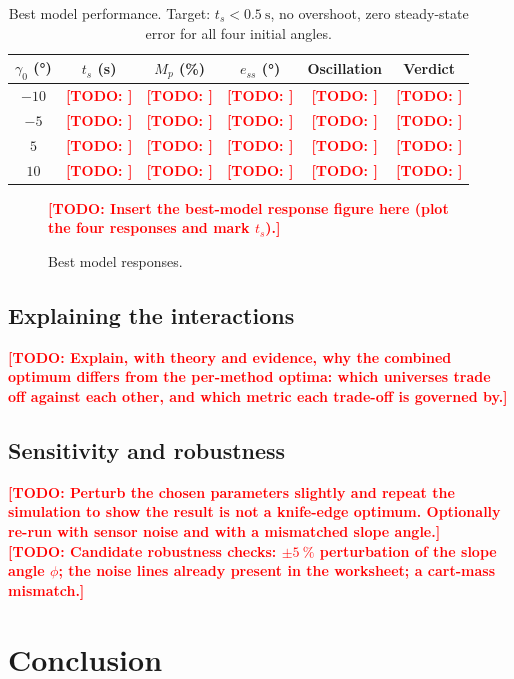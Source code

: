 \documentclass[11pt,a4paper]{article}
\newcommand{\todo}[1]{\textcolor{red}{\textbf{[TODO: #1]}}}
\newcommand{\gam}{\ensuremath{\gamma}}
\newcommand{\ts}{\ensuremath{t_s}}
\newcommand{\overshoot}{\ensuremath{M_p}}
\newcommand{\sse}{\ensuremath{e_{ss}}}
\begin{document}
\begin{table}[H]
\centering
\small
\begin{tabular}{@{}cccccc@{}}
\toprule
$\gam_0$ (\si{\degree}) & $\ts$ (\si{\s}) & $\overshoot$ (\si{\%}) & $\sse$ (\si{\degree}) & Oscillation & Verdict \\
\midrule
$-10$ & \todo{} & \todo{} & \todo{} & \todo{} & \todo{} \\
$-5$  & \todo{} & \todo{} & \todo{} & \todo{} & \todo{} \\
$5$   & \todo{} & \todo{} & \todo{} & \todo{} & \todo{} \\
$10$  & \todo{} & \todo{} & \todo{} & \todo{} & \todo{} \\
\bottomrule
\end{tabular}
\caption{Best model performance. Target: $\ts < \SI{0.5}{\s}$, no overshoot,
zero steady-state error for all four initial angles.}
\label{tab:best}
\end{table}

\begin{figure}[H]
\centering
\todo{Insert the best-model response figure here (plot the four responses and
mark $\ts$).}
\caption{Best model responses.}
\label{fig:best}
\end{figure}

\subsection{Explaining the interactions}
\label{sec:interactions}

\todo{Explain, with theory and evidence, why the combined optimum differs from
the per-method optima: which universes trade off against each other, and which
metric each trade-off is governed by.}

\subsection{Sensitivity and robustness}
\label{sec:robustness}

\todo{Perturb the chosen parameters slightly and repeat the simulation to show
the result is not a knife-edge optimum. Optionally re-run with sensor noise and
with a mismatched slope angle.}\\
\todo{Candidate robustness checks: $\pm\SI{5}{\%}$ perturbation of the slope
angle $\phi$; the noise lines already present in the worksheet; a cart-mass
mismatch.}

\section{Conclusion}
\label{sec:conclusion}
\end{document}
